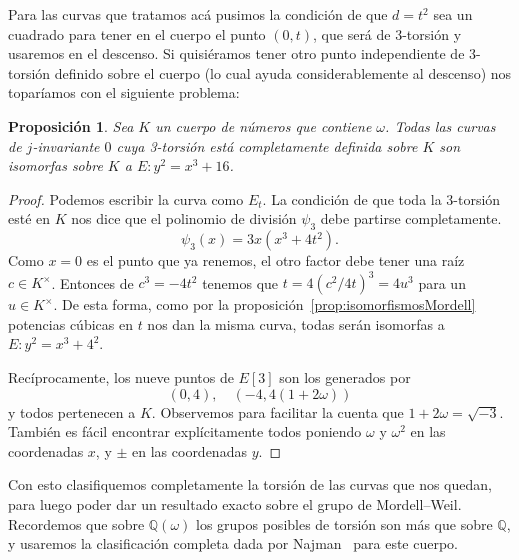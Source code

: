 \documentclass[a4paper]{book}
\theoremstyle{definition}
\theoremstyle{plain}
\newtheorem{prop}[definition]{Proposición}
\newcommand{\QQ}{\mathbb{Q}}
\begin{document}
Para las curvas que tratamos acá pusimos la condición de que $d=t^2$ sea un cuadrado para tener en el cuerpo el punto $(0,t)$, que será de 3-torsión y usaremos en el descenso. Si quisiéramos tener otro punto independiente de 3-torsión definido sobre el cuerpo (lo cual ayuda considerablemente al descenso) nos toparíamos con el siguiente problema:

\begin{prop}
Sea $K$ un cuerpo de números que contiene $\omega$. Todas las curvas de $j$-invariante $0$ cuya 3-torsión está completamente definida sobre $K$ son isomorfas sobre $K$ a $E:y^2=x^3+16$.
\end{prop}
\begin{proof}
Podemos escribir la curva como $E_t$. La condición de que toda la 3-torsión esté en $K$ nos dice que el polinomio de división $\psi_3$ debe partirse completamente.
\[
\psi_3(x)=3x(x^3+4t^2).
\]
Como $x=0$ es el punto que ya renemos, el otro factor debe tener una raíz $c\in K^\times$. Entonces de $c^3=-4 t^2$ tenemos que $t=4{(c^2/4t)}^3 = 4 u^3$ para un $u\in K^\times$. De esta forma, como por la proposición~\ref{prop:isomorfismosMordell} potencias cúbicas en $t$ nos dan la misma curva, todas serán isomorfas a $E:y^2=x^3+4^2$.

Recíprocamente, los nueve puntos de $E[3]$ son los generados por
\[
(0, 4),\quad (-4, 4(1+2\omega))
\]
y todos pertenecen a $K$. Observemos para facilitar la cuenta que $1+2\omega = \sqrt{-3}$. También es fácil encontrar explícitamente todos poniendo $\omega$ y $\omega^2$ en las coordenadas $x$, y $\pm$ en las coordenadas $y$.
\end{proof}

Con esto clasifiquemos completamente la torsión de las curvas que nos quedan, para luego poder dar un resultado exacto sobre el grupo de Mordell--Weil. Recordemos que sobre $\QQ(\omega)$ los grupos posibles de torsión son más que sobre $\QQ$, y usaremos la clasificación completa dada por Najman~\cite{Najman2010Completa} para este cuerpo.
\end{document}
